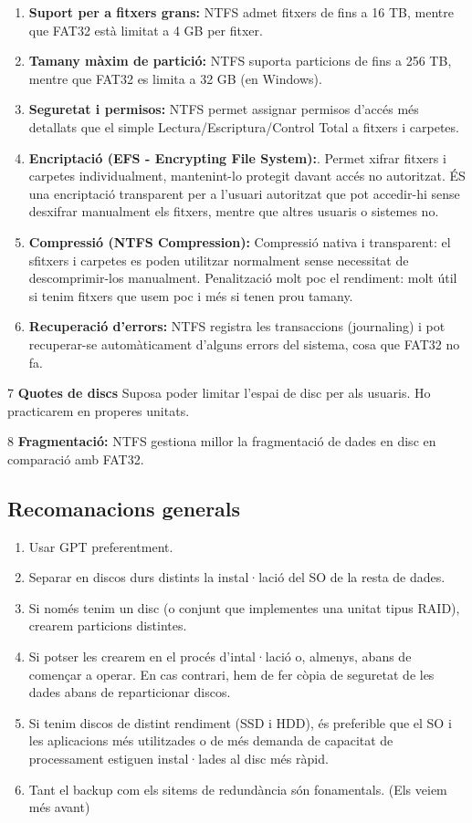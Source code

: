 \documentclass[
  a4paper,
]{article}
\providecommand{\tightlist}{%
  \setlength{\itemsep}{0pt}\setlength{\parskip}{0pt}}
\begin{document}
\begin{enumerate}
\def\labelenumi{\arabic{enumi}.}
\item
  \textbf{Suport per a fitxers grans:} NTFS admet fitxers de fins a 16
  TB, mentre que FAT32 està limitat a 4 GB per fitxer.
\item
  \textbf{Tamany màxim de partició:} NTFS suporta particions de fins a
  256 TB, mentre que FAT32 es limita a 32 GB (en Windows).
\item
  \textbf{Seguretat i permisos:} NTFS permet assignar permisos d'accés
  més detallats que el simple Lectura/Escriptura/Control Total a fitxers
  i carpetes.
\item
  \textbf{Encriptació (EFS - Encrypting File System):}. Permet xifrar
  fitxers i carpetes individualment, mantenint-lo protegit davant accés
  no autoritzat. ÉS una encriptació transparent per a l'usuari
  autoritzat que pot accedir-hi sense desxifrar manualment els fitxers,
  mentre que altres usuaris o sistemes no.
\item
  \textbf{Compressió (NTFS Compression):} Compressió nativa i
  transparent: el sfitxers i carpetes es poden utilitzar normalment
  sense necessitat de descomprimir-los manualment. Penalització molt poc
  el rendiment: molt útil si tenim fitxers que usem poc i més si tenen
  prou tamany.
\item
  \textbf{Recuperació d'errors:} NTFS registra les transaccions
  (journaling) i pot recuperar-se automàticament d'alguns errors del
  sistema, cosa que FAT32 no fa.
\end{enumerate}

7 \textbf{Quotes de discs} Suposa poder limitar l'espai de disc per als
usuaris. Ho practicarem en properes unitats.

8 \textbf{Fragmentació:} NTFS gestiona millor la fragmentació de dades
en disc en comparació amb FAT32.

\subsection{Recomanacions generals}\label{recomanacions-generals}

\begin{enumerate}
\def\labelenumi{\arabic{enumi}.}
\tightlist
\item
  Usar GPT preferentment.
\item
  Separar en discos durs distints la instal·lació del SO de la resta de
  dades.
\item
  Si només tenim un disc (o conjunt que implementes una unitat tipus
  RAID), crearem particions distintes.
\item
  Si potser les crearem en el procés d'intal·lació o, almenys, abans de
  començar a operar. En cas contrari, hem de fer còpia de seguretat de
  les dades abans de reparticionar discos.
\item
  Si tenim discos de distint rendiment (SSD i HDD), és preferible que el
  SO i les aplicacions més utilitzades o de més demanda de capacitat de
  processament estiguen instal·lades al disc més ràpid.
\item
  Tant el backup com els sitems de redundància són fonamentals. (Els
  veiem més avant)
\end{enumerate}
\end{document}
